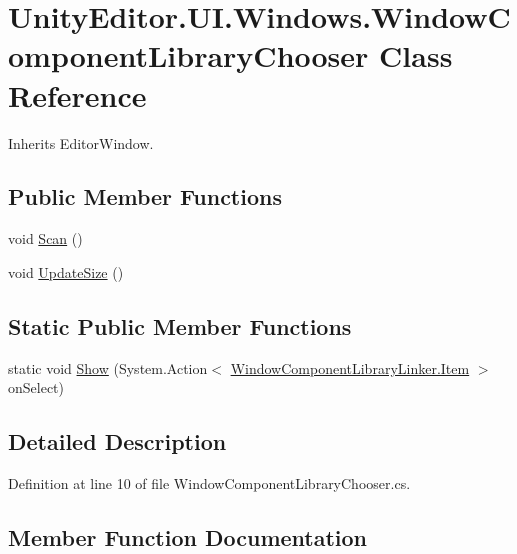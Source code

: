 \hypertarget{class_unity_editor_1_1_u_i_1_1_windows_1_1_window_component_library_chooser}{}\section{Unity\+Editor.\+U\+I.\+Windows.\+Window\+Component\+Library\+Chooser Class Reference}
\label{class_unity_editor_1_1_u_i_1_1_windows_1_1_window_component_library_chooser}


Inherits Editor\+Window.

\subsection*{Public Member Functions}
\begin{DoxyCompactItemize}
\item 
void \hyperlink{class_unity_editor_1_1_u_i_1_1_windows_1_1_window_component_library_chooser_a92fa96d006405137b09859c8c038e0e0}{Scan} ()
\item 
void \hyperlink{class_unity_editor_1_1_u_i_1_1_windows_1_1_window_component_library_chooser_ac44623fec1998797f1a02cd95dbd6eea}{Update\+Size} ()
\end{DoxyCompactItemize}
\subsection*{Static Public Member Functions}
\begin{DoxyCompactItemize}
\item 
static void \hyperlink{class_unity_editor_1_1_u_i_1_1_windows_1_1_window_component_library_chooser_a372b7c5091604831f7c667278caad9bc}{Show} (System.\+Action$<$ \hyperlink{class_unity_engine_1_1_u_i_1_1_windows_1_1_window_component_library_linker_1_1_item}{Window\+Component\+Library\+Linker.\+Item} $>$ on\+Select)
\end{DoxyCompactItemize}


\subsection{Detailed Description}


Definition at line 10 of file Window\+Component\+Library\+Chooser.\+cs.



\subsection{Member Function Documentation}
\hypertarget{class_unity_editor_1_1_u_i_1_1_windows_1_1_window_component_library_chooser_a92fa96d006405137b09859c8c038e0e0}{}

